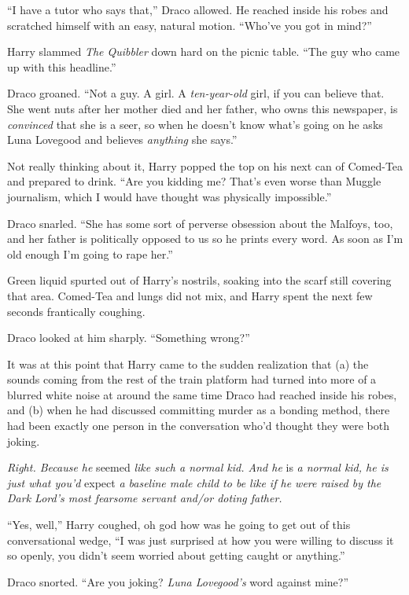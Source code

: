 “I have a tutor who says that,” Draco allowed. He reached inside his robes and scratched himself with an easy, natural motion. “Who’ve you got in mind?”

Harry slammed \emph{The Quibbler} down hard on the picnic table. “The guy who came up with this headline.”

Draco groaned. “Not a guy. A girl. A \emph{ten-year-old} girl, if you can believe that. She went nuts after her mother died and her father, who owns this newspaper, is \emph{convinced} that she is a seer, so when he doesn’t know what’s going on he asks Luna Lovegood and believes \emph{anything} she says.”

Not really thinking about it, Harry popped the top on his next can of Comed-Tea and prepared to drink. “Are you kidding me? That’s even worse than Muggle journalism, which I would have thought was physically impossible.”

Draco snarled. “She has some sort of perverse obsession about the Malfoys, too, and her father is politically opposed to us so he prints every word. As soon as I’m old enough I’m going to rape her.”

Green liquid spurted out of Harry’s nostrils, soaking into the scarf still covering that area. Comed-Tea and lungs did not mix, and Harry spent the next few seconds frantically coughing.

Draco looked at him sharply. “Something wrong?”

It was at this point that Harry came to the sudden realization that (a) the sounds coming from the rest of the train platform had turned into more of a blurred white noise at around the same time Draco had reached inside his robes, and (b) when he had discussed committing murder as a bonding method, there had been exactly one person in the conversation who’d thought they were both joking.

\emph{Right. Because he} seemed \emph{like such a normal kid. And he} is \emph{a normal kid, he is just what you’d} expect \emph{a baseline male child to be like if he were raised by the Dark Lord’s most fearsome servant and/or doting father.}

“Yes, well,” Harry coughed, oh god how was he going to get out of this conversational wedge, “I was just surprised at how you were willing to discuss it so openly, you didn’t seem worried about getting caught or anything.”

Draco snorted. “Are you joking? \emph{Luna Lovegood’s} word against mine?”

